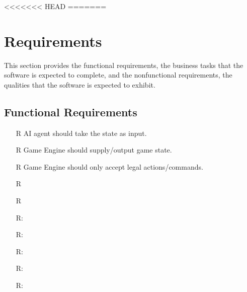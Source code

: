 \documentclass[12pt]{article}
\newcounter{reqnum} %
\begin{document}
<<<<<<< HEAD
\newpage
=======

\section{Requirements}


This section provides the functional requirements, the business tasks that the
software is expected to complete, and the nonfunctional requirements, the
qualities that the software is expected to exhibit.

\subsection{Functional Requirements}

\noindent \begin{itemize}

\item[R\refstepcounter{reqnum}\thereqnum] AI agent should take the state as input.

\item[R\refstepcounter{reqnum}\thereqnum] Game Engine should supply/output game state.

\item[R\refstepcounter{reqnum}\thereqnum] Game Engine should only accept legal actions/commands. %

\item[R\refstepcounter{reqnum}\thereqnum] 

\item[R\refstepcounter{reqnum}\thereqnum]

\item[R\refstepcounter{reqnum}\thereqnum \label{R_Inputs}:] 

\item[R\refstepcounter{reqnum}\thereqnum \label{R_OutputInputs}:] 

\item[R\refstepcounter{reqnum}\thereqnum \label{R_Calculate}:] 

\item[R\refstepcounter{reqnum}\thereqnum \label{R_VerifyOutput}:]

\item[R\refstepcounter{reqnum}\thereqnum \label{R_Output}:] 

\end{itemize}
\end{document}
